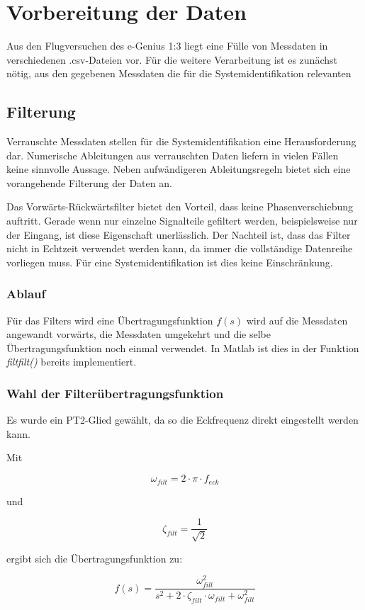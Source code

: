 \chapter{Vorbereitung der Daten}

Aus den Flugversuchen des e-Genius 1:3 liegt eine Fülle von Messdaten in verschiedenen .csv-Dateien vor. Für die weitere 
Verarbeitung ist es zunächst nötig, aus den gegebenen Messdaten die für die Systemidentifikation relevanten

\section{Filterung} %

Verrauschte Messdaten stellen für die Systemidentifikation eine Herausforderung dar. Numerische Ableitungen aus verrauschten Daten liefern in vielen Fällen keine sinnvolle Aussage. Neben aufwändigeren Ableitungsregeln bietet sich eine vorangehende Filterung der Daten an.

Das Vorwärts-Rückwärtsfilter bietet den Vorteil, dass keine Phasenverschiebung auftritt. Gerade wenn nur einzelne Signalteile gefiltert werden, beispielsweise nur der Eingang, ist diese Eigenschaft unerlässlich. Der Nachteil ist, dass das Filter nicht in Echtzeit verwendet werden kann, da immer die vollständige Datenreihe vorliegen muss. Für eine Systemidentifikation ist dies keine Einschränkung.

\subsection{Ablauf}

Für das Filters wird eine Übertragungsfunktion $f(s)$ wird auf die Messdaten angewandt vorwärts, die Messdaten umgekehrt und die selbe Übertragungsfunktion noch einmal verwendet. In Matlab ist dies in der Funktion \textit{filtfilt()} bereits implementiert. 

\subsection{Wahl der Filterübertragungsfunktion}

Es wurde ein PT2-Glied gewählt, da so die Eckfrequenz direkt eingestellt werden kann.

Mit

\begin{equation}
	\omega_{filt} = 2 \cdot \pi \cdot f_{eck}
\end{equation}

und

\begin{equation}
	\zeta_{filt} = \frac{1}{\sqrt{2}}
\end{equation}

ergibt sich die Übertragungsfunktion zu:

\begin{equation}
	f(s) = \frac{\omega_{filt}^2}{s^2+2 \cdot \zeta_{filt} \cdot \omega_{filt} +\omega_{filt}^2}
\end{equation}